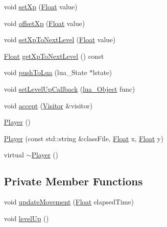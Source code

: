 \begin{DoxyCompactItemize}
\item 
void \hyperlink{classZeta_1_1Player_a16fc5395962d2a0d6022038a04effcc8}{set\+Xp} (\hyperlink{namespaceZeta_a1e0a1265f9b3bd3075fb0fabd39088ba}{Float} value)
\item 
void \hyperlink{classZeta_1_1Player_a80ac761708c20f55faa0158e80f394be}{offset\+Xp} (\hyperlink{namespaceZeta_a1e0a1265f9b3bd3075fb0fabd39088ba}{Float} value)
\item 
void \hyperlink{classZeta_1_1Player_a2a978dfe97f6e32e39c78dfaebf1af39}{set\+Xp\+To\+Next\+Level} (\hyperlink{namespaceZeta_a1e0a1265f9b3bd3075fb0fabd39088ba}{Float} value)
\item 
\hyperlink{namespaceZeta_a1e0a1265f9b3bd3075fb0fabd39088ba}{Float} \hyperlink{classZeta_1_1Player_a5c17fe17fd7a67a5e9d58b812ef72ffe}{get\+Xp\+To\+Next\+Level} () const 
\item 
void \hyperlink{classZeta_1_1Player_a72a7d06fbbcef4d096211cf6a80d5fb6}{push\+To\+Lua} (lua\+\_\+\+State $\ast$lstate)
\item 
void \hyperlink{classZeta_1_1Player_a2801d34fcd1497e73865482b743a5040}{set\+Level\+Up\+Callback} (\hyperlink{ZetaConfig_8hpp_ae7be32b73848041a60f2412f72bbb221}{lua\+\_\+\+Object} func)
\item 
void \hyperlink{classZeta_1_1Player_adc1fe500bc911c0eb7b73364d951db3c}{accept} (\hyperlink{classZeta_1_1Visitor}{Visitor} \&visitor)
\item 
\hyperlink{classZeta_1_1Player_adc06e1109f910e6b28546bb94c75dda3}{Player} ()
\item 
\hyperlink{classZeta_1_1Player_ac1a7c73ef662e1fcaf4f83ebb6c38fa9}{Player} (const std\+::string \&class\+File, \hyperlink{namespaceZeta_a1e0a1265f9b3bd3075fb0fabd39088ba}{Float} x, \hyperlink{namespaceZeta_a1e0a1265f9b3bd3075fb0fabd39088ba}{Float} y)
\item 
virtual \hyperlink{classZeta_1_1Player_aa136d1f1c5f1d1e32b8aeb35fe7b5d3a}{$\sim$\+Player} ()
\end{DoxyCompactItemize}
\subsection*{Private Member Functions}
\begin{DoxyCompactItemize}
\item 
void \hyperlink{classZeta_1_1Player_ab8a83fff1013ce770f28e6510b1e55f6}{update\+Movement} (\hyperlink{namespaceZeta_a1e0a1265f9b3bd3075fb0fabd39088ba}{Float} elapsed\+Time)
\item 
void \hyperlink{classZeta_1_1Player_ae6511bc7f20627689bca026a7ba2354e}{level\+Up} ()
\end{DoxyCompactItemize}

